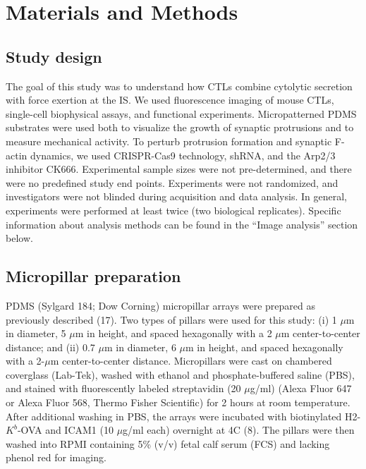 \section{Materials and Methods}

\subsection{Study design}
The goal of this study was to understand how CTLs combine cytolytic secretion with force exertion at the IS. We used fluorescence imaging of mouse CTLs, single-cell biophysical assays, and functional experiments. Micropatterned PDMS substrates were used both to visualize the growth of synaptic protrusions and to measure mechanical activity. To perturb protrusion formation and synaptic F-actin dynamics, we used CRISPR-Cas9 technology, shRNA, and the Arp2/3 inhibitor CK666. Experimental sample sizes were not pre-determined, and there were no predefined study end points. Experiments were not randomized, and investigators were not blinded during acquisition and data analysis. In general, experiments were performed at least twice (two biological replicates). Specific information about analysis methods can be found in the “Image analysis” section below.

\subsection{Micropillar preparation}
PDMS (Sylgard 184; Dow Corning) micropillar arrays were prepared as previously described (17). Two types of pillars were used for this study: (i) 1 $\mu$m in diameter, 5 $\mu$m in height, and spaced hexagonally with a 2 $\mu$m center-to-center distance; and (ii) 0.7 $\mu$m in diameter, 6 $\mu$m in height, and spaced hexagonally with a 2-$\mu$m center-to-center distance. Micropillars were cast on chambered coverglass (Lab-Tek), washed with ethanol and phosphate-buffered saline (PBS), and stained with fluorescently labeled streptavidin (20 $\mu$g/ml) (Alexa Fluor 647 or Alexa Fluor 568, Thermo Fisher Scientific) for 2 hours at room temperature. After additional washing in PBS, the arrays were incubated with biotinylated H2-$K^{b}$-OVA and ICAM1 (10 $\mu$g/ml each) overnight at 4\degree C (8). The pillars were then washed into RPMI containing 5\% (v/v) fetal calf serum (FCS) and lacking phenol red for imaging.

